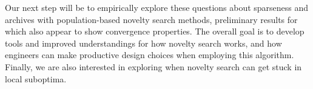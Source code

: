 \documentclass[twoside]{article}
\begin{document}
Our next step will be to empirically explore these questions about sparseness and archives with population-based novelty search methods, preliminary results for which also appear to show convergence properties.  
The overall goal is to develop tools and improved understandings for how novelty search works, and how engineers can make productive design choices when employing this algorithm.  Finally, we are also interested in exploring when novelty search can get stuck in local suboptima.

\small



\end{document}
